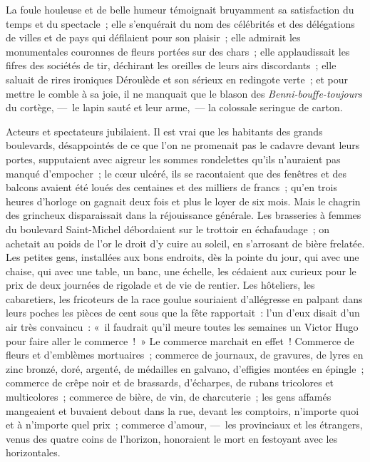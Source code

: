 \documentclass[french,twoside]{book} %
\begin{document}
La foule houleuse et de belle humeur témoignait bruyamment sa satisfaction du temps et du spectacle ; elle s’enquérait du nom des célébrités et des délégations de villes et de pays qui défilaient pour son plaisir ; elle admirait les monumentales couronnes de fleurs portées sur des chars ; elle applaudissait les fifres des sociétés de tir, déchirant les oreilles de leurs airs discordants ; elle saluait de rires ironiques Déroulède et son sérieux en redingote verte ; et  
\label{p5}pour mettre le comble à sa joie, il ne manquait que le blason des {\itshape Benni-bouffe-toujours} du cortège, — le lapin sauté et leur arme, — la colossale seringue de carton.\par
Acteurs et spectateurs jubilaient. Il est vrai que les habitants des grands boulevards, désappointés de ce que l’on ne promenait pas le cadavre devant leurs portes, supputaient avec aigreur les sommes rondelettes qu’ils n’auraient pas manqué d’empocher ; le cœur ulcéré, ils se racontaient que des fenêtres et des balcons avaient été loués des centaines et des milliers de francs ; qu’en trois heures d’horloge on gagnait deux fois et plus le loyer de six mois. Mais le chagrin des grincheux disparaissait dans la réjouissance générale. Les brasseries à femmes du boulevard Saint-Michel débordaient sur le trottoir en échafaudage ; on achetait au poids de l’or le droit d’y cuire au soleil, en s’arrosant de bière frelatée. Les petites gens, installées aux bons endroits, dès la pointe du jour, qui avec une chaise, qui avec une table, un banc, une échelle, les cédaient aux curieux pour le prix de deux journées de rigolade et de vie de rentier. Les hôteliers, les cabaretiers, les fricoteurs de la race goulue souriaient d’allégresse en palpant dans leurs poches les pièces de cent sous que la fête rapportait : l’un d’eux disait d’un air très convaincu : « il faudrait qu’il meure toutes les semaines un Victor Hugo pour faire aller le commerce ! » Le commerce marchait en effet ! Commerce de fleurs et d’emblèmes mortuaires ; commerce de journaux, de gravures, de lyres en zinc bronzé, doré, argenté, de médailles en galvano, d’effigies montées en  
\label{p6}épingle ; commerce de crêpe noir et de brassards, d’écharpes, de rubans tricolores et multicolores ; commerce de bière, de vin, de charcuterie ; les gens affamés mangeaient et buvaient debout dans la rue, devant les comptoirs, n’importe quoi et à n’importe quel prix ; commerce d’amour, — les provinciaux et les étrangers, venus des quatre coins de l’horizon, honoraient le mort en festoyant avec les horizontales.\par
\end{document}
